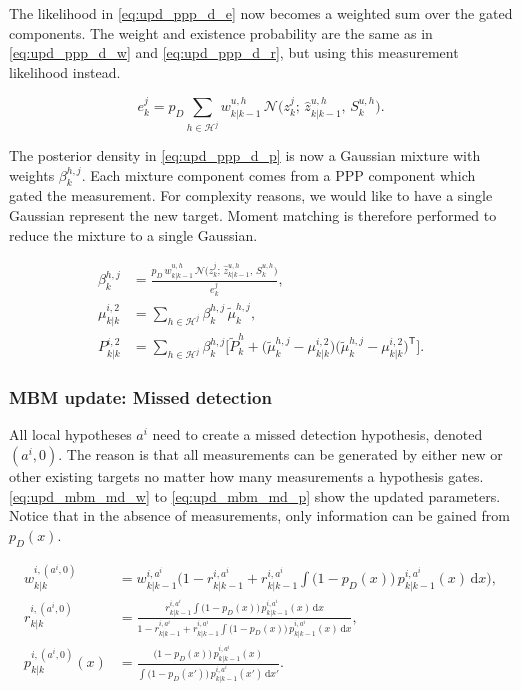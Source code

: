 The likelihood in \autoref{eq:upd_ppp_d_e} now becomes a weighted sum over the gated components. The weight and existence probability are the same as in \autoref{eq:upd_ppp_d_w} and \autoref{eq:upd_ppp_d_r}, but using this measurement likelihood instead.

\begin{equation*}
  e^j_k = p_D \sum_{h \in \mathcal{H}^j} w^{u,h}_{k|k-1}\,
    \mathcal{N}\big(z^j_k;\, \hat z^{u,h}_{k|k-1},\, S^{u,h}_k\big).
\end{equation*}

The posterior density in \autoref{eq:upd_ppp_d_p} is now a Gaussian mixture with weights $\beta^{h,j}_k$. Each mixture component comes from a PPP component which gated the measurement. For complexity reasons, we would like to have a single Gaussian represent the new target. Moment matching is therefore performed to reduce the mixture to a single Gaussian.

\begin{align*}
  \beta^{h,j}_k &= \frac{p_D\, w^{u,h}_{k|k-1}\,
    \mathcal{N}\big(z^j_k;\, \hat z^{u,h}_{k|k-1},\, S^{u,h}_k\big)}{e^j_k}, \\
  \mu^{i,2}_{k|k} &= \sum_{h \in \mathcal{H}^j} \beta^{h,j}_k\, \tilde\mu^{h,j}_k, \\
  P^{i,2}_{k|k} &= \sum_{h \in \mathcal{H}^j} \beta^{h,j}_k
    \Big[\tilde P^{h}_k + \big(\tilde\mu^{h,j}_k - \mu^{i,2}_{k|k}\big)
    \big(\tilde\mu^{h,j}_k - \mu^{i,2}_{k|k}\big)^{\mathsf{T}}\Big].
\end{align*}
\medskip

\subsubsection{MBM update: Missed detection}
All local hypotheses $a^i$ need to create a missed detection hypothesis, denoted $(a^i, 0)$. The reason is that all measurements can be generated by either new or other existing targets no matter how many measurements a hypothesis gates. \autoref{eq:upd_mbm_md_w} to \ref{eq:upd_mbm_md_p} show the updated parameters. Notice that in the absence of measurements, only information can be gained from $p_D(x)$. 

\begin{align}
  w^{i,(a^i,0)}_{k|k} &= w^{i,a^i}_{k|k-1}
    \Big(1 - r^{i,a^i}_{k|k-1} + r^{i,a^i}_{k|k-1}
    \int \big(1 - p_D(x)\big)\, p^{i,a^i}_{k|k-1}(x)\,\mathrm{d}x\Big), \label{eq:upd_mbm_md_w}\\
  r^{i,(a^i,0)}_{k|k} &= \frac{r^{i,a^i}_{k|k-1} \int \big(1 - p_D(x)\big)\, p^{i,a^i}_{k|k-1}(x)\,\mathrm{d}x}
    {1 - r^{i,a^i}_{k|k-1} + r^{i,a^i}_{k|k-1} \int \big(1 - p_D(x)\big)\, p^{i,a^i}_{k|k-1}(x)\,\mathrm{d}x}, \label{eq:upd_mbm_md_r}\\
  p^{i,(a^i,0)}_{k|k}(x) &= \frac{\big(1 - p_D(x)\big)\, p^{i,a^i}_{k|k-1}(x)}
    {\int \big(1 - p_D(x')\big)\, p^{i,a^i}_{k|k-1}(x')\,\mathrm{d}x'}. \label{eq:upd_mbm_md_p}
\end{align}

